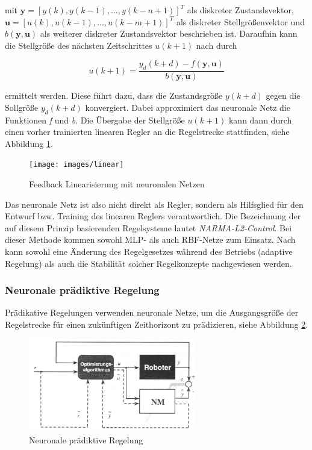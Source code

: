 mit $\textbf{y} = [y(k), y(k-1), ... , y(k-n+1)]^{T}$ als diskreter Zustandsvektor,          $\textbf{u} = [u(k), u(k-1),... ,u(k-m+1)]^{T}$ als diskreter Stellgrößenvektor und $b(\textbf{y},\textbf{u})$ als weiterer diskreter Zustandsvektor beschrieben ist.
Daraufhin kann die Stellgröße des nächsten Zeitschrittes $u(k+1)$ nach \cite{Mohammadzaheri.2012} durch 

\begin{equation} 
u(k+1) = \frac{y_d(k+d) - f(\textbf{y},\textbf{u})}{b(\textbf{y},\textbf{u})}
\end{equation}

ermittelt werden. Diese führt dazu, dass die Zustandsgröße $y(k+d)$ gegen die Sollgröße $y_d(k+d)$ konvergiert. Dabei approximiert das neuronale Netz die Funktionen \textit{f} und \textit{b}. Die Übergabe der Stellgröße $u(k+1)$ kann dann durch einen vorher trainierten linearen Regler an die Regelstrecke stattfinden, siehe Abbildung \ref{fig:linear}. 

\begin{figure} [H]
	\centering
	\texttt{[image: images/linear]}
	\caption{Feedback Linearisierung mit neuronalen Netzen \cite{Sklyarenko.2002}}
	\label{fig:linear}
\end{figure}


Das neuronale Netz ist also nicht direkt als Regler, sondern als Hilfsglied für den Entwurf bzw. Training des linearen Reglers verantwortlich. Die Bezeichnung der auf diesem Prinzip basierenden Regelsysteme lautet \textit{NARMA-L2-Control}. Bei dieser Methode kommen sowohl MLP- \cite{Leeghim.2008} als auch RBF-Netze \cite{Deng.2008} zum Einsatz. Nach \cite{Leeghim.2008} kann sowohl eine Änderung des Regelgesetzes während des Betriebs (adaptive Regelung) als auch die Stabilität solcher Regelkonzepte nachgewiesen werden.


\subsubsection{Neuronale prädiktive Regelung}


Prädikative Regelungen verwenden neuronale Netze, um die Ausgangsgröße der Regelstrecke für einen zukünftigen Zeithorizont zu prädizieren, siehe Abbildung \ref{fig:predictive}.


\begin{figure} [h]
	\centering
	\includegraphics[width=0.65\textwidth]{images/predictive}
	\caption{Neuronale prädiktive Regelung \cite{Sklyarenko.2002}}
	\label{fig:predictive}
\end{figure}




